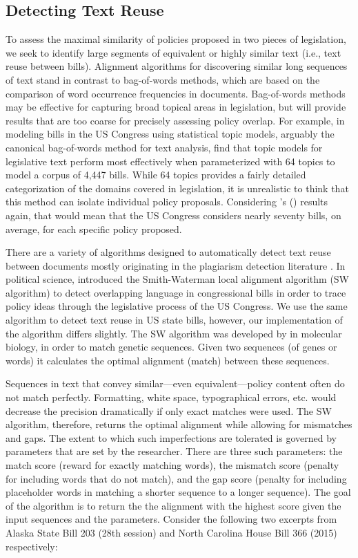 \documentclass[12pt]{article} %
\def\citeapos#1{\citeauthor{#1}'s (\citeyear{#1})}
\begin{document}
\subsection{Detecting Text Reuse}
\label{sec:d_t_r}
To assess the maximal similarity of policies proposed in two pieces of legislation, we seek to identify large segments of equivalent or highly similar text (i.e., text reuse between bills). Alignment algorithms for discovering similar long sequences of text stand in contrast to bag-of-words methods, which are based on the comparison of word occurrence frequencies in documents. Bag-of-words methods may be effective for capturing broad topical areas in legislation, but will provide results that are too coarse for precisely assessing policy overlap. For example, in modeling bills in the US Congress using statistical topic models, arguably the canonical bag-of-words method for text analysis, \citet{gerrish2011predicting} find that topic models for legislative text perform most effectively when parameterized with 64 topics to model a corpus of 4,447 bills. While 64 topics provides a fairly detailed categorization of the domains covered in legislation, it is unrealistic to think that this method can isolate individual policy proposals.  Considering \citeapos{gerrish2011predicting} results again, that would mean that the US Congress considers nearly seventy bills, on average, for each specific policy proposed. 

There are a variety of algorithms designed to automatically detect text reuse between documents mostly originating in the plagiarism detection literature \citep[see e.g.][for an overview]{potthast2013overview}. In political science, \citet{wilkerson2015tracing} introduced the Smith-Waterman local alignment algorithm (SW algorithm) to detect overlapping language in congressional bills in order to trace policy ideas through the legislative process of the US Congress. We use the same algorithm to detect text reuse in US state bills, however, our implementation of the algorithm differs slightly. The SW algorithm was developed by \citet{smith1981identification} in molecular biology, in order to match genetic sequences. Given two sequences (of genes or words) it calculates the optimal alignment (match) between these sequences. 

Sequences in text that convey similar---even equivalent---policy content often do not match perfectly. Formatting, white space, typographical errors, etc. would decrease the precision dramatically if only exact matches were used. The SW algorithm, therefore, returns the optimal alignment while allowing for mismatches and gaps. The extent to which such imperfections are tolerated is governed by parameters that are set by the researcher. There are three such parameters: the match score (reward for exactly matching words), the mismatch score (penalty for including words that do not match), and the gap score (penalty for including placeholder words in matching a shorter sequence to a longer sequence). The goal of the algorithm is to return the the alignment with the highest score given the input sequences and the parameters. Consider the following two excerpts from Alaska State Bill 203 (28th session) and North Carolina House Bill 366 (2015) respectively:
\end{document}
